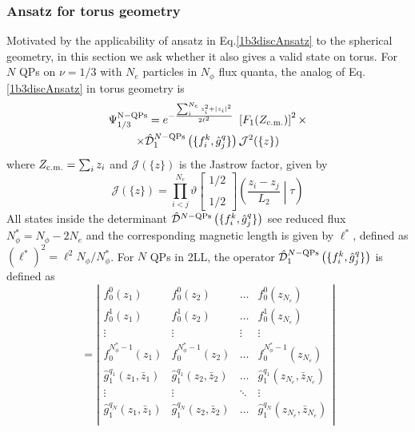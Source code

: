 \documentclass[prb,aps,epsfig,longbibliography,twocolumn]{revtex4-1}
\newcommand{\rbkt}[1]{\left( #1\right)}
\newcommand{\sbkt}[1]{\left[ #1\right]}
\newcommand{\np}{N_{\phi}}
\newcommand{\jbkt}[2]{\left( #1 \middle| #2\right)}
\newcommand{\rtheta}[4]{\vartheta \sbkt{ \substack{{#1} \\ \\{#2}}}	\jbkt{#3}{#4}}
\begin{document}
\subsubsection{Ansatz for torus geometry}
Motivated by the applicability of ansatz in  Eq.\eqref{1b3discAnsatz} to the spherical geometry, in this section we ask whether it also gives a valid state on torus. For $N$ QPs on $\nu=1/3$ with $N_e$ particles in $\np$ flux quanta, the analog of Eq.\eqref{1b3discAnsatz} in torus geometry is
\begin{multline}
\Psi^{\rm N-QPs}_{1/3}= e^{-\frac{\sum_i^{{N_e}} z^2_i+|z_i|^2  }{2\ell^2}}\ \sbkt{F_1(Z_{\rm c.m.})}^2  \times \\
  \times \hat{\mathcal{D}}^{ N\rm-QPs}_{1}\rbkt{\{f^k_i,\hat{g}^q_j\}} \mathcal{J}^{2}(\{z\}) \label{correctWF}
\end{multline}
where $Z_{\rm c.m.}=\sum_i z_i$ and $\mathcal{J}(\{z\}) $ is the Jastrow factor, given by
\begin{equation}
\mathcal{J}(\{z\}) = \prod_{i<j}^{N_e} \rtheta{1/2}{1/2}{\frac{z_i-z_j}{L_2}}{\tau}
\end{equation}
All states inside the determinant $\hat{\mathcal{D}}^{ N\rm-QPs}\rbkt{\{f^k_i,\hat{g}^q_j\}}$  see reduced flux $\np^{*} =\np - 2N_e$ and the corresponding magnetic length is given by $\ell^{*}$, defined as $({\ell^{*}})^{2}=\ell^2{\np}/\np^{*}$.  For $N$ QPs in 2LL, the operator  $\hat{\mathcal{D}}^{ N\rm-QPs}_{1}\rbkt{\{f^k_i,\hat{g}^q_j\}}$ is defined as
\begin{equation}\label{deter}
= \left\vert \begin{matrix}
f^{0}_{0}(z_1) & f^{0}_{0}(z_2) & \dots & f^{0}_{0}(z_{N_e}) \\
f^{1}_{0}(z_1) & f^{1}_{0}(z_2) & \dots & f^{1}_{0}(z_{N_e}) \\
\vdots & \vdots & \vdots & \vdots \\ 
f^{{\np^*-1}}_{0}(z_1) & f^{{\np^*-1}}_{0}(z_2) & \dots & f^{{\np^*-1}}_{0}(z_{N_e}) \\

\hat{g}^{q_1}_{1}(z_1,\bar{z}_1) & \hat{g}^{q_1}_{1}(z_2,\bar{z}_2) & \dots & \hat{g}^{q_1}_{1}(z_{N_e},\bar{z}_{N_e}) \\
\vdots & \vdots & \ddots & \vdots \\ 
\hat{g}^{q_{N}}_{1}(z_1,\bar{z}_1) & \hat{g}^{q_{N}}_{1}(z_2,\bar{z}_2) & \dots & \hat{g}^{q_{N}}_{1}(z_{N_e},\bar{z}_{N_e}) \\
\end{matrix}
\right\vert
\end{equation}
\end{document}
